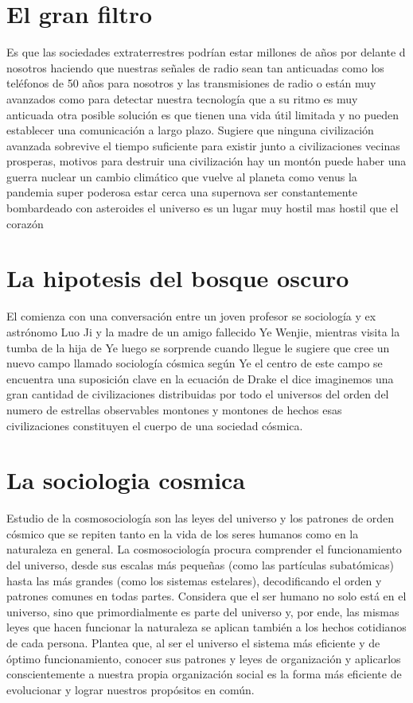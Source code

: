\documentclass[12pt a4paper]{article}
\begin{document}
\section{El gran filtro}
Es que las sociedades extraterrestres podrían estar millones de años por delante d nosotros haciendo que nuestras señales de radio sean tan anticuadas como los teléfonos de 50 años para nosotros y las transmisiones de radio o están muy avanzados como para detectar nuestra tecnología que a su ritmo es muy anticuada otra posible solución es que tienen una vida útil limitada y no pueden establecer una comunicación a largo plazo. Sugiere que ninguna civilización avanzada sobrevive el tiempo suficiente para existir junto a civilizaciones vecinas prosperas, motivos para destruir una civilización hay un montón puede haber una guerra nuclear un cambio climático que vuelve al planeta como venus la pandemia super poderosa estar cerca una supernova ser constantemente bombardeado con asteroides el universo es un lugar muy hostil mas hostil que el corazón 
\section{La hipotesis del bosque oscuro}
El comienza con una conversación entre un joven profesor se sociología y ex astrónomo Luo Ji y la madre de un amigo fallecido Ye Wenjie, mientras visita la tumba de la hija de Ye luego se sorprende cuando llegue le sugiere que cree un nuevo campo llamado sociología cósmica según Ye el centro de este campo se encuentra una suposición clave en la ecuación de Drake el dice imaginemos una gran cantidad de civilizaciones distribuidas por todo el  universos del orden del numero de estrellas observables montones y montones de hechos esas civilizaciones constituyen el cuerpo de  una sociedad cósmica.
\section{La sociologia cosmica}
Estudio de la cosmosociología son las leyes del universo y los patrones de orden cósmico que se repiten tanto en la vida de los seres humanos como en la naturaleza en general. La cosmosociología procura comprender el funcionamiento del universo, desde sus escalas más pequeñas (como las partículas subatómicas) hasta las más grandes (como los sistemas estelares), decodificando el orden y patrones comunes en todas partes.
Considera que el ser humano no solo está en el universo, sino que primordialmente es parte del universo y, por ende, las mismas leyes que hacen funcionar la naturaleza se aplican también a los hechos cotidianos de cada persona. Plantea que, al ser el universo el sistema más eficiente y de óptimo funcionamiento, conocer sus patrones y leyes de organización y aplicarlos conscientemente a nuestra propia organización social es la forma más eficiente de evolucionar y lograr nuestros propósitos en común.
\end{document}
